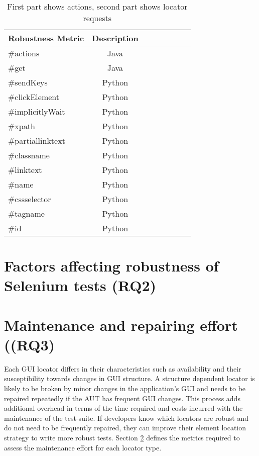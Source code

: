 \begin{center}
\begin{table}[h]
\centering
\begin{tabular}{l*{6}{c}r}
\hline
Robustness Metric              &Description \\
\hline
\#actions & Java  \\
\#get      & Java\\
\#sendKeys & Python   \\
\#clickElement     & Python  \\
\#implicitlyWait    & Python   \\
\hline
\#xpath    & Python   \\
\#partiallinktext    & Python   \\
\#classname    & Python   \\
\#linktext    & Python   \\
\#name    & Python   \\
\#cssselector    & Python   \\
\#tagname    & Python   \\
\#id    & Python   \\
\hline
\end{tabular}

\caption{First part shows actions, second part shows locator requests}
\label{rq2metrics}
\end{table}
\end{center}

\section{Factors affecting robustness of Selenium tests (RQ2)}
\label{robustnessFactors}
\section{Maintenance and repairing effort ((RQ3)}
\label{locatorMaintenance}

Each GUI locator differs in their characteristics such as availability and their susceptibility towards changes in GUI structure. A structure dependent locator is likely to be broken by minor changes in the application's GUI and needs to be repaired repeatedly if the AUT has frequent GUI changes. This process adds additional overhead in terms of the time required and costs incurred with the maintenance of the test-suite. If developers know which locators are robust and do not need to be frequently repaired, they can improve their element location strategy to write more robust tests. Section \ref{locatorMaintenance} defines the metrics required to assess the maintenance effort for each locator type. 


